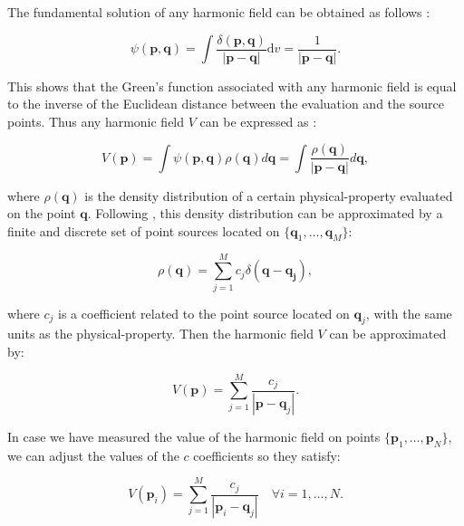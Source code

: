 \documentclass[twocolumn]{article}
\begin{document}
The fundamental solution of any harmonic field can be obtained as follows
\citep{blakely1995}:

\begin{equation}
    \psi(\mathbf{p}, \mathbf{q})
    =
    \int
    \frac{\delta(\mathbf{p}, \mathbf{q})}{|\mathbf{p} - \mathbf{q}|}
    \textrm{d}v
    =
    \frac{1}{|\mathbf{p} - \mathbf{q}|}.
\end{equation}

This shows that the Green's function associated with any harmonic field is
equal to the inverse of the Euclidean distance between the evaluation and the
source points.
Thus any harmonic field $V$ can be expressed as \citep[p.~37]{blakely1995}:

\begin{equation}
    V(\mathbf{p})
    =
    \int \psi(\mathbf{p}, \mathbf{q}) \rho(\mathbf{q}) d\mathbf{q}
    =
    \int \frac{\rho(\mathbf{q})}{|\mathbf{p} - \mathbf{q}|}  d\mathbf{q},
\end{equation}

\noindent where $\rho(\mathbf{q})$ is the density distribution of a certain
physical-property evaluated on the point $\mathbf{q}$. Following
\citet{dampney1969}, this density distribution can be approximated by a finite
and discrete set of point sources located on $\{\mathbf{q}_1, \ldots,
\mathbf{q}_M\}$:

\begin{equation}
    \rho(\mathbf{q}) =
        \sum\limits_{j=1}^{M} c_j \delta(\mathbf{q} - \mathbf{q_j}),
\end{equation}

\noindent where $c_j$ is a coefficient related to the point source located on
$\mathbf{q}_j$, with the same units as the physical-property.
Then the harmonic field $V$ can be approximated by:

\begin{equation}
    V(\mathbf{p})
    =
    \sum\limits_{j=1}^{M} \frac{c_j}{|\mathbf{p} - \mathbf{q}_j|}.
    \label{eq:eql-field}
\end{equation}

In case we have measured the value of the harmonic field on points
$\{\mathbf{p}_1, \ldots, \mathbf{p}_N\}$, we can adjust the values of the $c$
coefficients so they satisfy:

\begin{equation}
    V(\mathbf{p}_i)
    =
    \sum\limits_{j=1}^{M} \frac{c_j}{|\mathbf{p}_i - \mathbf{q}_j|}
    \quad \forall i=1,\ldots,N.
\end{equation}
\end{document}
